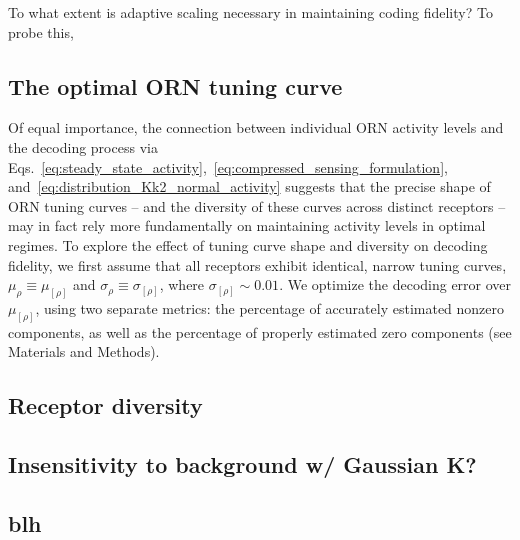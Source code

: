 \documentclass[9pt,twocolumn,twoside]{pnas-new}
\begin{document}
To what extent is adaptive scaling necessary in maintaining coding fidelity? To probe this, 

\subsection*{The optimal ORN tuning curve}

Of equal importance, the connection between individual ORN activity levels and the decoding process via Eqs.~\ref{eq:steady_state_activity},~\ref{eq:compressed_sensing_formulation}, and~\ref{eq:distribution_Kk2_normal_activity} suggests that the precise shape of ORN tuning curves -- and the diversity of these curves across distinct receptors -- may in fact rely more fundamentally on maintaining activity levels in optimal regimes. To explore the effect of tuning curve shape and diversity on decoding fidelity, we first assume that all receptors exhibit identical, narrow tuning curves, $\mu_\rho \equiv \mu_{[\rho]}$ and $\sigma_\rho \equiv \sigma_{[\rho]}$, where $\sigma_{[\rho]}\sim 0.01$. We optimize the decoding error over $\mu_{[\rho]}$, using two separate metrics: the percentage of accurately estimated nonzero components, as well as the percentage of properly estimated zero components (see Materials and Methods). 



\subsection*{Receptor diversity }

\subsection*{Insensitivity to background w/ Gaussian K?}





\subsection*{blh}
\end{document}
